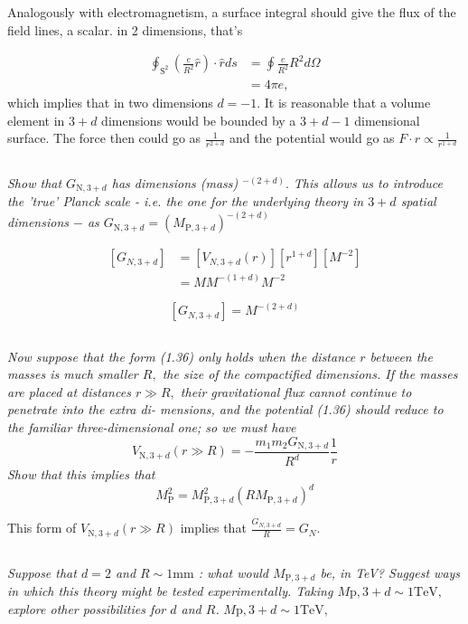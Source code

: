 \documentclass{article}
\begin{document}
Analogously with electromagnetism, a surface integral should give the flux of the field lines, a scalar. in 2 dimensions, that's 

\begin{align*}
    \oint_{\mathrm{S^2}}\left(\frac{e}{R^{2}} \hat{r}\right) \cdot \hat{r} d s &=\oint \frac{e}{R^{2}} R^{2} d \Omega\\
    &= 4 \pi e,
\end{align*}
which implies that in two dimensions $d = -1$. It is reasonable that a volume element in $3+d$ dimensions would be bounded by a $3 + d - 1$ dimensional surface. The force then could go as $\frac{1}{r^{2+d}}$ and the potential would go as $F \cdot r \propto \frac{1}{r^{1+d}}$

\subsection{}
\textit{Show that $G_{\mathrm{N}, 3+d}$ has dimensions (mass) $^{-(2+d)} .$ This allows us to introduce the 'true' Planck scale - i.e. the one for the underlying theory in $3+d$ spatial dimensions $-$ as $G_{\mathrm{N}, 3+d}=\left(M_{\mathrm{P}, 3+d}\right)^{-(2+d)}$}

\begin{align*}
    \left[G_{N, 3 + d}\right]&=\left[V_{N, 3+d}(r)\right]\left[r^{1+d}\right]\left[M^{-2}\right]\\
    &=M M^{-(1+d)} M^{-2}
\end{align*}

$$\boxed{\left[G_{N, 3 + d}\right] = M^{-(2 + d)}}$$

\subsection{}
\textit{Now suppose that the form (1.36) only holds when the distance $r$ between the masses is much smaller $R,$ the size of the compactified dimensions. If the masses are placed at distances $r \gg R,$ their gravitational flux cannot continue to penetrate into the extra di- mensions, and the potential (1.36) should reduce to the familiar three-dimensional one; so we must have
$$
V_{\mathrm{N}, 3+d}(r \gg R)=-\frac{m_{1} m_{2} G_{\mathrm{N}, 3+d}}{R^{d}} \frac{1}{r}
$$
Show that this implies that
$$
M_{\mathrm{P}}^{2}=M_{\mathrm{P}, 3+d}^{2}\left(R M_{\mathrm{P}, 3+d}\right)^{d}
$$}

This form of $V_{\mathrm{N}, 3+d}(r \gg R)$ implies that $\frac{G_{N, 3+d}}{R}=G_{N}$.
\subsection{}
\textit{Suppose that $d=2$ and $R \sim 1 \mathrm{mm}$ : what would $M_{\mathrm{P}, 3+d}$ be, in TeV? Suggest ways in which this theory might be tested experimentally. Taking $M \mathrm{p}, 3+d \sim 1 \mathrm{TeV},$ explore other possibilities for $d$ and $R$.}
$M \mathrm{p}, 3+d \sim 1 \mathrm{TeV},$
\newpage
\end{document}
